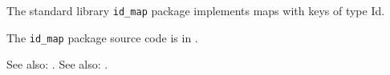 
The standard library {\tt id\_map} package implements maps with keys of type Id.

The {\tt id\_map} package source code is in .

See also:  .
See also:  .


